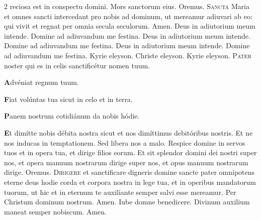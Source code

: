 \begin{multicols}{2}
\vspace{+1em}
\newline {}
reciosa est in conspectu domini. \R Mors sanctorum eius.  Oremus.
\lettrine[lines=2]{\zallmancaps \color{Red} S}{ancta} Maria et omnes sancti intercedant pro nobis ad dominum, ut mereamur adiuvari ab eo: qui vivit et regnat per omnia secula seculorum. Amen.
\newline \V Deus in adiutorium meum intende. \R Domine ad adiuvandum me festina.
\newline \V Deus in adiutorium meum intende. \R Domine ad adiuvandum me festina.
\newline \V Deus in adiutorium meum intende. \R Domine ad adiuvandum me festina.
\newline \doxology
\newline Kyrie eleyson. Christe eleyson. Kyrie eleyson. 
\lettrine[lines=2]{\zallmancaps \color{Red} P}{ater} noster qui es in celis sanctificétur nomen tuum.
\begingroup
\setlength{\parindent}{.25em}
\par {\bfseries \color{Blue} A}dvéniat regnum tuum.
\par {\bfseries \color{Red} F}iat volúntas tua sicut in celo et in terra.
\par {\bfseries \color{Blue} P}anem nostrum cotidiánum da nobis hódie.
\par {\bfseries \color{Red} E}t dimítte nobis débita nostra sicut et nos dimíttimus debitóribus nostris.
\aftergroup\clearparshape%
\endgroup
\newline {} Et ne nos inducas in temptationem. \R Sed libera nos a malo.
\newline \V Respice domine in servos tuos et in opera tua, et dirige filios eorum. \R Et sit splendor domini dei nostri super nos, et opera manuum nostrarum dirige super nos, et opus manuum nostrarum dirige.  Oremus.
\lettrine[lines=2]{\zallmancaps \color{Blue} D}{irigere} et sanctificare digneris domine sancte pater omnipotens eterne deus hodie corda et corpora nostra in lege tua, et in operibus mandatorum tuorum, ut hic et in eternum te auxiliante semper salvi esse mereamur. Per Christum dominum nostrum. Amen.
\newline {} Iube domne benedicere.
\newline Divinum auxilium maneat semper nobiscum. \R Amen.
\newline {}

\end{multicols}
